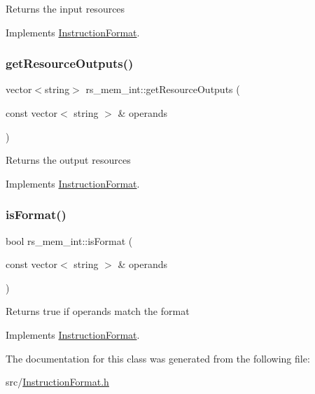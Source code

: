 Returns the input resources 

Implements \hyperlink{classInstructionFormat_a09775d3a3c22f40a0f44504664e586e4}{Instruction\+Format}.

\mbox{\label{classrs__mem__int_a181c97b7f9f26c5a3d0b7fd7949628b4}} 
\subsubsection{\texorpdfstring{get\+Resource\+Outputs()}{getResourceOutputs()}}
{\footnotesize\ttfamily vector$<$string$>$ rs\+\_\+mem\+\_\+int\+::get\+Resource\+Outputs (\begin{DoxyParamCaption}\item[{const vector$<$ string $>$ \&}]{operands }\end{DoxyParamCaption})\hspace{0.3cm}{\ttfamily [virtual]}}

Returns the output resources 

Implements \hyperlink{classInstructionFormat_a95cd28ffb1bde59b67f676880ab10536}{Instruction\+Format}.

\mbox{\label{classrs__mem__int_a49a72c354a4ff7e9dda94f75810de59f}} 
\subsubsection{\texorpdfstring{is\+Format()}{isFormat()}}
{\footnotesize\ttfamily bool rs\+\_\+mem\+\_\+int\+::is\+Format (\begin{DoxyParamCaption}\item[{const vector$<$ string $>$ \&}]{operands }\end{DoxyParamCaption})\hspace{0.3cm}{\ttfamily [virtual]}}

Returns true if operands match the format 

Implements \hyperlink{classInstructionFormat_a9fdcf94dcd7d9a55ba86e7a63f04d1fe}{Instruction\+Format}.



The documentation for this class was generated from the following file\+:\begin{DoxyCompactItemize}
\item 
src/\hyperlink{InstructionFormat_8h}{Instruction\+Format.\+h}\end{DoxyCompactItemize}
